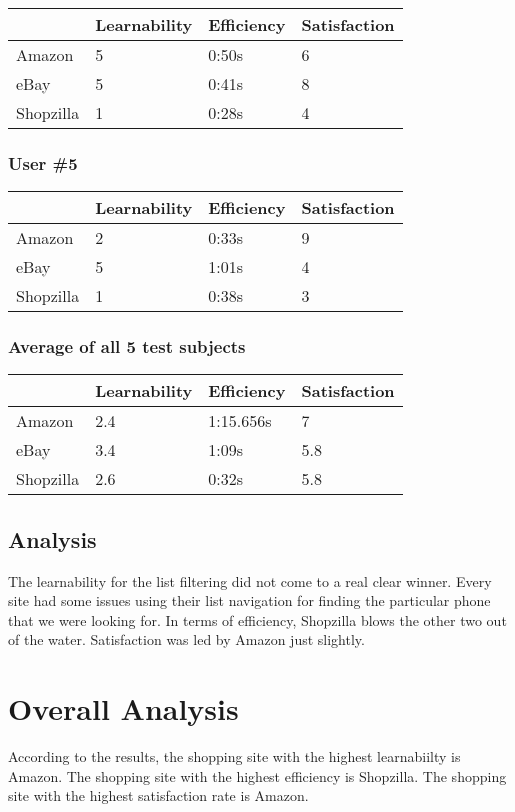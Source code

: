 \documentclass[11pt, oneside]{article}   	%
\begin{document}
\begin{tabular}{| l | l | l | l |}
    \hline
     & Learnability & Efficiency & Satisfaction \\ \hline
    Amazon & 5 & 0:50s & 6 \\ \hline
    eBay & 5 & 0:41s & 8 \\ \hline
    Shopzilla & 1 & 0:28s & 4 \\\hline
\end{tabular}

\subsubsection{User \#5}

\begin{tabular}{| l | l | l | l |}
    \hline
     & Learnability & Efficiency & Satisfaction \\ \hline
    Amazon & 2 & 0:33s & 9 \\ \hline
    eBay & 5 & 1:01s & 4 \\ \hline
    Shopzilla & 1 & 0:38s & 3 \\\hline
\end{tabular}

\subsubsection{Average of all 5 test subjects}

\begin{tabular}{| l | l | l | l |}
    \hline
     & Learnability & Efficiency & Satisfaction \\ \hline
    Amazon & 2.4 & 1:15.656s & 7 \\ \hline
    eBay & 3.4 & 1:09s & 5.8 \\ \hline
    Shopzilla & 2.6 & 0:32s & 5.8 \\\hline
\end{tabular}

\subsection{Analysis}
The learnability for the list filtering did not come to a real clear winner. Every site had some issues using their list navigation for finding the particular phone that we were looking for. In terms of efficiency, Shopzilla blows the other two out of the water. Satisfaction was led by Amazon just slightly.

\section{Overall Analysis}

According to the results, the shopping site with the highest learnabiilty is Amazon. The shopping site with the highest efficiency is Shopzilla. The shopping site with the highest satisfaction rate is Amazon.
\end{document}
